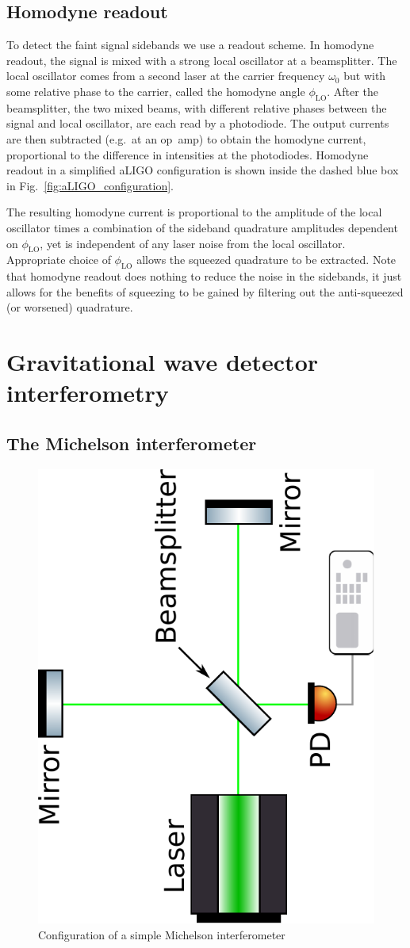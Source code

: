 \documentclass[aps,pra,superscriptaddress,reprint,nofootinbib]{revtex4-1}
\begin{document}
\subsection{Homodyne readout}

To detect the faint signal sidebands we use a readout scheme. In homodyne readout, the signal is mixed with a strong local oscillator at a beamsplitter. The local oscillator comes from a second laser at the carrier frequency $\omega_0$ but with some relative phase to the carrier, called the homodyne angle $\phi_{\mathrm{LO}}$. After the beamsplitter, the two mixed beams, with different relative phases between the signal and local oscillator, are each read by a photodiode. The output currents are then subtracted (e.g.\ at an op~amp) to obtain the homodyne current, proportional to the difference in intensities at the photodiodes. Homodyne readout in a simplified aLIGO configuration is shown inside the dashed blue box in Fig.~\ref{fig:aLIGO_configuration}.


The resulting homodyne current is proportional to the amplitude of the local oscillator times a combination of the sideband quadrature amplitudes dependent on $\phi_{\mathrm{LO}}$, yet is independent of any laser noise from the local oscillator. Appropriate choice of $\phi_{\mathrm{LO}}$ allows the squeezed quadrature to be extracted. Note that homodyne readout does nothing to reduce the noise in the sidebands, it just allows for the benefits of squeezing to be gained by filtering out the anti-squeezed (or worsened) quadrature.


\section{Gravitational wave detector interferometry}
\label{sec:gwIFO}

\subsection{The Michelson interferometer}

\begin{figure}
	\begin{center}
	\includegraphics[height=0.5\textwidth,angle=-90]{figures/Michelson_interferometer.pdf}
	\end{center}
	\caption{Configuration of a simple Michelson interferometer}
	\label{fig:Michelson}
\end{figure}
\end{document}
